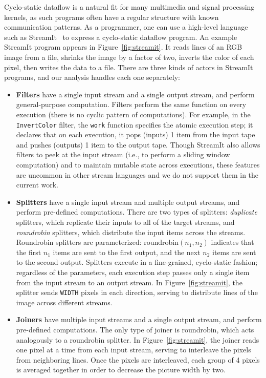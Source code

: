 Cyclo-static dataflow is a natural fit for many multimedia and signal
processing kernels, as such programs often have a regular structure
with known communication patterns.  As a programmer, one can use a
high-level language such as StreamIt~\cite{streamitcc} to express a
cyclo-static dataflow program.  An example StreamIt program appears in
Figure~\ref{fig:streamit}.  It reads lines of an RGB image from a
file, shrinks the image by a factor of two, inverts the color of each
pixel, then writes the data to a file.  There are three kinds of
actors in StreamIt programs, and our analysis handles each one
separately:
\begin{itemize}

\item {\bf Filters} have a single input stream and a single output
  stream, and perform general-purpose computation.  Filters perform
  the same function on every execution (there is no cyclic pattern of
  computations).  For example, in the {\tt InvertColor} filter, the
  {\tt work} function specifies the atomic execution step; it declares
  that on each execution, it pops (inputs) 1 item from the input tape
  and pushes (outputs) 1 item to the output tape.  Though StreamIt
  also allows filters to peek at the input stream (i.e., to perform a
  sliding window computation) and to maintain mutable state across
  executions, these features are uncommon in other stream languages
  and we do not support them in the current work.

\item {\bf Splitters} have a single input stream and multiple output
  streams, and perform pre-defined computations.  There are two types
  of splitters: {\it duplicate} splitters, which replicate their
  inputs to all of the target streams, and {\it roundrobin} splitters,
  which distribute the input items across the streams.  Roundrobin
  splitters are parameterized: roundrobin$(n_1, n_2)$ indicates that
  the first $n_1$ items are sent to the first output, and the next
  $n_2$ items are sent to the second output.  Splitters execute in a
  fine-grained, cyclo-static fashion; regardless of the parameters,
  each execution step passes only a single item from the input stream
  to an output stream.  In Figure~\ref{fig:streamit}, the splitter
  sends {\tt WIDTH} pixels in each direction, serving to distribute
  lines of the image across different streams.

\item {\bf Joiners} have multiple input streams and a single output
  stream, and perform pre-defined computations.  The only type of
  joiner is roundrobin, which acts analogously to a roundrobin
  splitter.  In Figure~\ref{fig:streamit}, the joiner reads one pixel
  at a time from each input stream, serving to interleave the pixels
  from neighboring lines.  Once the pixels are interleaved, each group
  of 4 pixels is averaged together in order to decrease the picture
  width by two.

\end{itemize}


